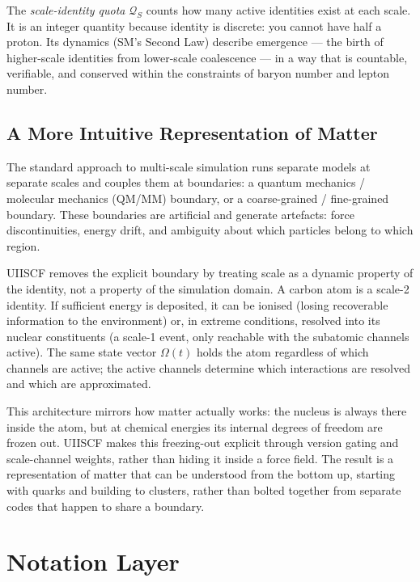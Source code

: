 \documentclass[11pt,a4paper]{article}
\newcommand{\Quota}{\mathcal{Q}}
\begin{document}
The \emph{scale-identity quota} $\Quota_S$ counts how many active identities
exist at each scale.  It is an integer quantity because identity is discrete:
you cannot have half a proton.  Its dynamics (SM's Second Law) describe
emergence --- the birth of higher-scale identities from lower-scale
coalescence --- in a way that is countable, verifiable, and conserved within
the constraints of baryon number and lepton number.

\subsection{A More Intuitive Representation of Matter}

The standard approach to multi-scale simulation runs separate models at
separate scales and couples them at boundaries: a quantum mechanics / molecular
mechanics (QM/MM) boundary, or a coarse-grained / fine-grained boundary.
These boundaries are artificial and generate artefacts: force discontinuities,
energy drift, and ambiguity about which particles belong to which region.

UIISCF removes the explicit boundary by treating scale as a dynamic property
of the identity, not a property of the simulation domain.  A carbon atom is a
scale-2 identity.  If sufficient energy is deposited, it can be ionised (losing
recoverable information to the environment) or, in extreme conditions,
resolved into its nuclear constituents (a scale-1 event, only reachable with
the subatomic channels active).  The same state vector $\Omega(t)$ holds the
atom regardless of which channels are active; the active channels determine
which interactions are resolved and which are approximated.

This architecture mirrors how matter actually works: the nucleus is always
there inside the atom, but at chemical energies its internal degrees of
freedom are frozen out.  UIISCF makes this freezing-out explicit through
version gating and scale-channel weights, rather than hiding it inside a
force field.  The result is a representation of matter that can be understood
from the bottom up, starting with quarks and building to clusters, rather
than bolted together from separate codes that happen to share a boundary.

\section{Notation Layer}\label{sec:notation}
\end{document}
